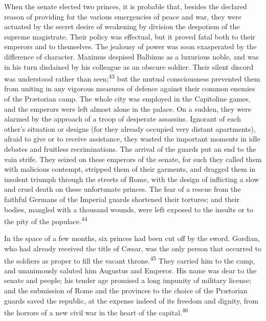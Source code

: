 When the senate elected two princes, it is probable that, besides
the declared reason of providing for the various emergencies of
peace and war, they were actuated by the secret desire of
weakening by division the despotism of the supreme magistrate.
Their policy was effectual, but it proved fatal both to their
emperors and to themselves. The jealousy of power was soon
exasperated by the difference of character. Maximus despised
Balbinus as a luxurious noble, and was in his turn disdained by
his colleague as an obscure soldier. Their silent discord was
understood rather than seen;\textsuperscript{43} but the mutual consciousness
prevented them from uniting in any vigorous measures of defence
against their common enemies of the Prætorian camp. The whole
city was employed in the Capitoline games, and the emperors were
left almost alone in the palace. On a sudden, they were alarmed
by the approach of a troop of desperate assassins. Ignorant of
each other’s situation or designs (for they already occupied very
distant apartments), afraid to give or to receive assistance,
they wasted the important moments in idle debates and fruitless
recriminations. The arrival of the guards put an end to the vain
strife. They seized on these emperors of the senate, for such
they called them with malicious contempt, stripped them of their
garments, and dragged them in insolent triumph through the
streets of Rome, with the design of inflicting a slow and cruel
death on these unfortunate princes. The fear of a rescue from the
faithful Germans of the Imperial guards shortened their tortures;
and their bodies, mangled with a thousand wounds, were left
exposed to the insults or to the pity of the populace.\textsuperscript{44}



In the space of a few months, six princes had been cut off by the
sword. Gordian, who had already received the title of Cæsar, was
the only person that occurred to the soldiers as proper to fill
the vacant throne.\textsuperscript{45} They carried him to the camp, and
unanimously saluted him Augustus and Emperor. His name was dear
to the senate and people; his tender age promised a long impunity
of military license; and the submission of Rome and the provinces
to the choice of the Prætorian guards saved the republic, at the
expense indeed of its freedom and dignity, from the horrors of a
new civil war in the heart of the capital.\textsuperscript{46}

